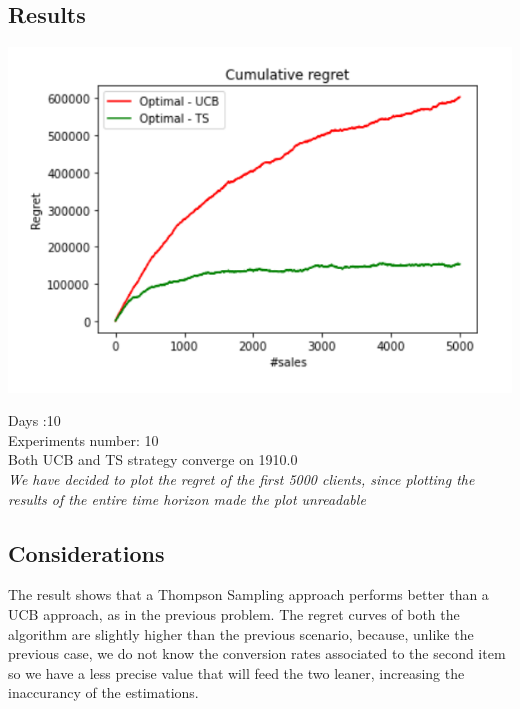 \subsection*{Results}
\begin{center}
	\includegraphics[scale=1.2]{Images/n4}
\end{center}
Days :10\\
Experiments number: 10 \\
Both UCB and TS strategy converge on 1910.0\\
\textit{We have decided to plot the regret of the first 5000 clients, since plotting the results of the entire time horizon made the plot unreadable}

\subsection*{Considerations}
The result shows that a Thompson Sampling approach performs better than a UCB approach, as in the previous problem. The regret curves of both the algorithm are slightly higher than the previous scenario, because, unlike the previous case, we do not know the conversion rates associated to the second item so we have a less precise value that will feed the two leaner, increasing the inaccurancy of the estimations.  
